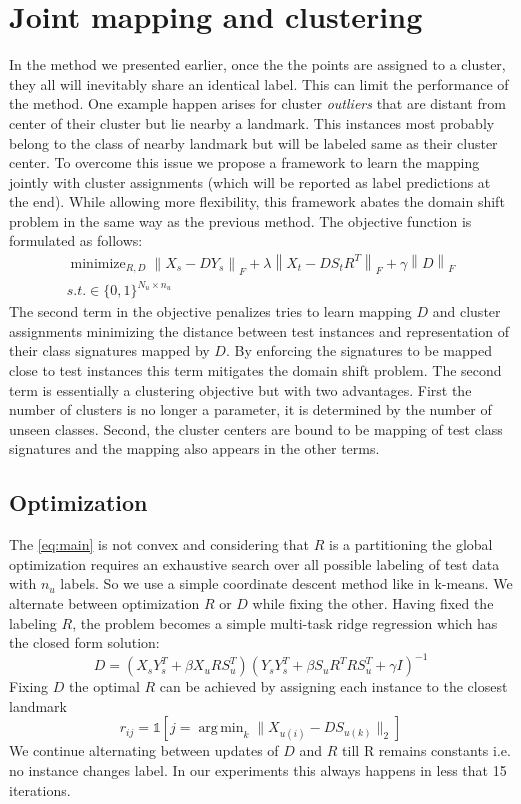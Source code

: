 \documentclass[wcp]{jmlr}
\newcommand{\norm}[1]{\left \lVert #1 \right \rVert_{F}}
\DeclareMathOperator*{\argmin}{arg\,min}
\DeclareMathOperator*{\minimize}{minimize}
\begin{document}
\section{Joint mapping and clustering}
In the method we presented earlier, once the the points are assigned to a cluster,
they all will inevitably share an identical label. This can limit the performance of the method. One
example happen arises for cluster \textit{outliers} that are distant from center of their cluster but lie
nearby a landmark. This instances most probably belong to the class of nearby landmark but will be labeled same
as their cluster center. To overcome this issue we propose a framework to learn the mapping jointly with cluster assignments
 (which will be reported as label predictions at the end).
 While allowing more flexibility, this framework abates the domain shift problem in the same way as the previous method.
 The objective function is formulated as follows:
 \begin{align} \label{eq:main}
   \minimize_{R,D} \norm{X_s - D Y_s}  + \lambda \norm{X_t - D S_t R^T } + \gamma \norm{D} \\
   s.t. \in \{0,1\}^{N_u \times n_u}
 \end{align}
 The second term in the objective penalizes tries to learn mapping $D$ and cluster assignments minimizing the
 distance between test instances and representation of their class signatures mapped by $D$. By enforcing
 the signatures to be mapped close to test instances this term mitigates the domain shift problem.
 The second term is essentially a clustering objective but with two advantages. First the number of clusters is no longer a
 parameter, it is determined by the number of unseen classes. Second, the cluster centers are bound to be
 mapping of test class signatures and the mapping also appears in the other terms.

\subsection{Optimization}
The \eqref{eq:main} is not convex and considering that $R$ is a partitioning the global optimization requires an
exhaustive search over all possible labeling of test data with $n_u$ labels. So we use a simple coordinate descent
method like in k-means. We alternate between optimization $R$ or $D$ while fixing the other.
Having fixed the labeling $R$, the problem becomes a simple multi-task ridge regression which has the closed form solution:
\begin{equation} \label{eq:d_update}
  D = (X_s Y_s^T + \beta X_u R S_u^T) (Y_s Y_s^T + \beta S_u R^T R S_u^T  + \gamma I)^{-1}
\end{equation}
Fixing $D$ the optimal $R$ can be achieved by assigning each instance to the closest landmark
\begin{equation} \label{eq:r_update}
  r_{ij} = \mathds{1}[j = \argmin_{k} \lVert X_{u(i)} - D S_{u(k)} \rVert_2 ]
\end{equation}
We continue alternating between updates of $D$ and $R$ till R remains constants i.e. no instance changes label. In our experiments this always happens
in less that 15 iterations.
\end{document}
